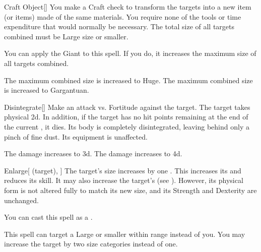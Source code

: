 \lowercase{\hypertarget{spell:Craft Object}{}}\label{spell:Craft Object}
\begin{freeability}[Rank 4]{\hypertarget{spell:Craft Object}{Craft Object}}[]
You make a Craft check to transform the targets into a new item (or items) made of the same materials.
You require none of the tools or time expenditure that would normally be necessary.
The total size of all targets combined must be Large size or smaller.

You can apply the Giant  to this spell.
If you do, it increases the maximum size of all targets combined.

\rankline
{} The maximum combined size is increased to Huge.
 The maximum combined size is increased to Gargantuan.

\end{freeability}
\vspace{0.25em}



\lowercase{\hypertarget{spell:Disintegrate}{}}\label{spell:Disintegrate}
\begin{freeability}[Rank 4]{\hypertarget{spell:Disintegrate}{Disintegrate}}[]
Make an attack vs. Fortitude against the target.
\hit The target takes physical  \plus2d.
In addition, if the target has no hit points remaining at the end of the current , it dies.
Its body is completely disintegrated, leaving behind only a pinch of fine dust.
Its equipment is unaffected.

\rankline
{} The damage increases to  \plus3d.
 The damage increases to  \plus4d.

\end{freeability}
\vspace{0.25em}



\lowercase{\hypertarget{spell:Enlarge}{}}\label{spell:Enlarge}
\begin{attuneability}[Rank 4]{\hypertarget{spell:Enlarge}{Enlarge}}[ (target), ]
The target's size increases by one .
This increases its  and reduces its  skill.
It may also increase the target's  (see ).
However, its physical form is not altered fully to match its new size, and its Strength and Dexterity are unchanged.

You can cast this spell as a .

\rankline
{} This spell can target a Large or smaller  within \rngmed range instead of you.
 You may increase the target by two size categories instead of one.

\end{attuneability}
\vspace{0.25em}



